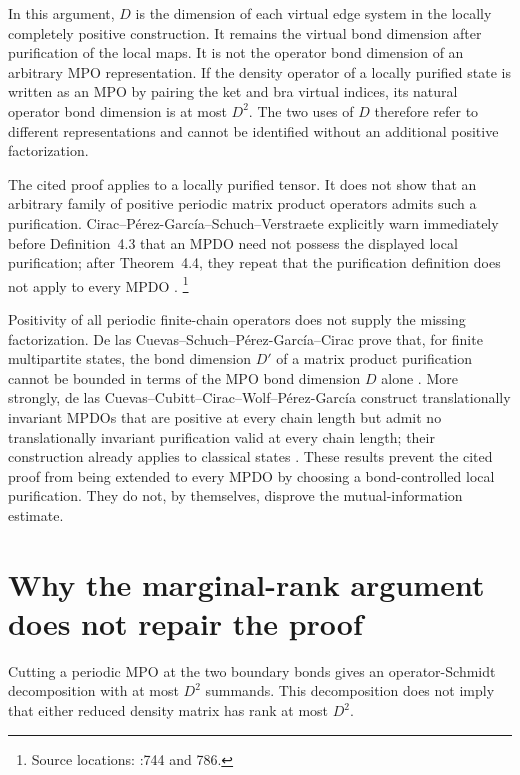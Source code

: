 \documentclass[11pt]{article}
\begin{document}
In this argument, $D$ is the dimension of each virtual edge system in the
locally completely positive construction. It remains the virtual bond
dimension after purification of the local maps. It is not the operator bond
dimension of an arbitrary MPO representation. If the density operator of a
locally purified state is written as an MPO by pairing the ket and bra virtual
indices, its natural operator bond dimension is at most $D^2$. The two uses of
$D$ therefore refer to different representations and cannot be identified
without an additional positive factorization.

The cited proof applies to a locally purified tensor. It does not show that an
arbitrary family of positive periodic matrix product operators admits such a
purification. Cirac--P\'erez-Garc\'ia--Schuch--Verstraete explicitly warn
immediately before Definition~4.3 that an MPDO need not possess the displayed
local purification; after Theorem~4.4, they repeat that the purification
definition does not apply to every MPDO \cite{Cirac2016MPDO_arXiv}.
\footnote{Source locations:
:744 and 786.}

Positivity of all periodic finite-chain operators does not supply the missing
factorization. De las Cuevas--Schuch--P\'erez-Garc\'ia--Cirac prove that, for
finite multipartite states, the bond dimension $D'$ of a matrix product
purification cannot be bounded in terms of the MPO bond dimension $D$ alone
\cite{DeLasCuevas2013Purifications}. More strongly, de las
Cuevas--Cubitt--Cirac--Wolf--P\'erez-Garc\'ia construct translationally
invariant MPDOs that are positive at every chain length but admit no
translationally invariant purification valid at every chain length; their
construction already applies to classical states
\cite{DeLasCuevas2016Fundamental}. These results prevent the cited proof from
being extended to every MPDO by choosing a bond-controlled local purification.
They do not, by themselves, disprove the mutual-information estimate.

\section{Why the marginal-rank argument does not repair the proof}

Cutting a periodic MPO at the two boundary bonds gives an operator-Schmidt
decomposition with at most $D^2$ summands. This decomposition does not imply
that either reduced density matrix has rank at most $D^2$.
\end{document}
